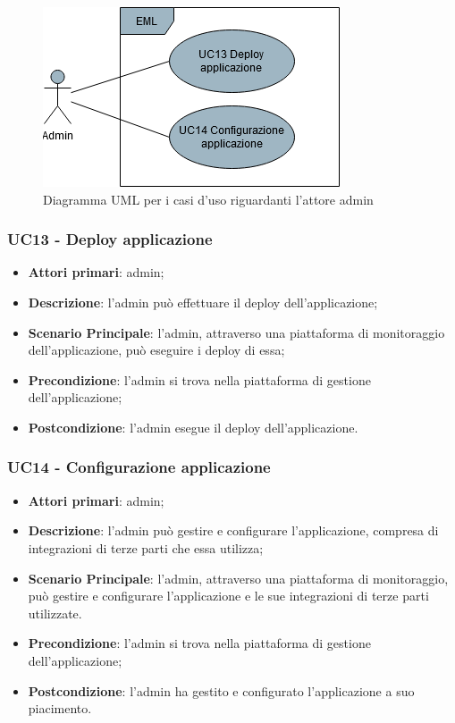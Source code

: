 \begin{figure}[H]
\centering
\includegraphics[scale=0.6]{res/UseCase/Immagini/Admin}
\caption{Diagramma UML per i casi d'uso riguardanti l'attore admin}
\end{figure}

\subsubsection{UC13 - Deploy applicazione}
\begin{itemize}
\item \textbf{Attori primari}: admin;
\item \textbf{Descrizione}: l'admin può effettuare il deploy dell'applicazione;
\item \textbf{Scenario Principale}: l'admin, attraverso una piattaforma di monitoraggio dell'applicazione, può eseguire i deploy di essa;
\item \textbf{Precondizione}: l'admin si trova nella piattaforma di gestione dell'applicazione;
\item \textbf{Postcondizione}: l'admin esegue il deploy dell'applicazione.
\end{itemize}

\subsubsection{UC14 - Configurazione applicazione}
\begin{itemize}
\item \textbf{Attori primari}: admin;
\item \textbf{Descrizione}: l'admin può gestire e configurare l'applicazione, compresa di integrazioni di terze parti che essa utilizza;
\item \textbf{Scenario Principale}: l'admin, attraverso una piattaforma di monitoraggio, può gestire e configurare l'applicazione e le sue integrazioni di terze parti utilizzate.
\item \textbf{Precondizione}: l'admin si trova nella piattaforma di gestione dell'applicazione;
\item \textbf{Postcondizione}: l'admin ha gestito e configurato l'applicazione a suo piacimento.
\end{itemize}

